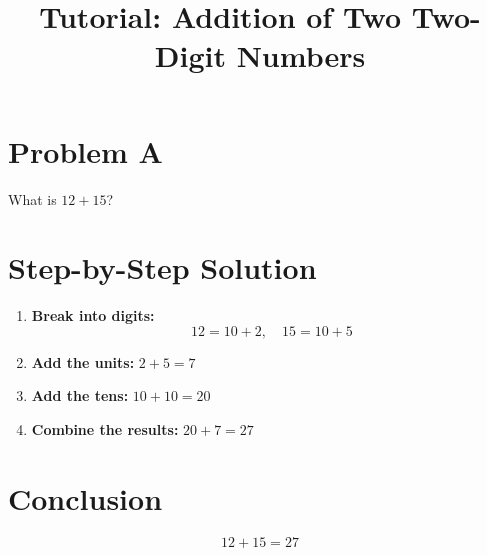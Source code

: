 \documentclass{article}
\begin{document}
\title{Tutorial: Addition of Two Two-Digit Numbers}
\date{}
\maketitle

\section*{Problem A}
What is $12 + 15$?

\section*{Step-by-Step Solution}
\begin{enumerate}[label=Step \arabic*:, leftmargin=*]
    \item \textbf{Break into digits:}
          \[
              12 = 10 + 2,\quad 15 = 10 + 5
          \]

    \item \textbf{Add the units:} $2 + 5 = 7$

    \item \textbf{Add the tens:} $10 + 10 = 20$

    \item \textbf{Combine the results:} $20 + 7 = 27$
\end{enumerate}

\section*{Conclusion}
\[
    12 + 15 = 27
\]
\end{document}
